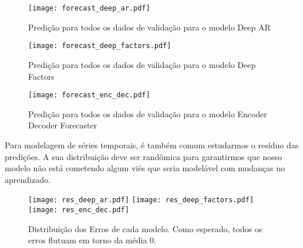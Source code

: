 \begin{figure}[H]
  \label{fig:fordeepar}
  \centering
\texttt{[image: forecast\_deep\_ar.pdf]} 
\caption{Predição para todos os dados de validação para o modelo Deep AR}
\end{figure}

\begin{figure}[H]
  \label{fig:fordeepfactors}
  \centering
\texttt{[image: forecast\_deep\_factors.pdf]} 
\caption{Predição para todos os dados de validação para o modelo Deep Factors}
\end{figure}

\begin{figure}[H]
  \label{fig:forencdec}
  \centering
\texttt{[image: forecast\_enc\_dec.pdf]} 
\caption{Predição para todos os dados de validação para o modelo Encoder Decoder Forecaster} 
\end{figure}


Para modelagem de séries temporais, é também comum estudarmos o resíduo das predições. A sua distribuição deve ser randômica para garantirmos que nosso modelo não está cometendo algum viés que seria
modelável com mudanças no aprendizado. \\


\begin{figure}[H]
\label{fig:distr}
\centering
\texttt{[image: res\_deep\_ar.pdf]} \hfill
\texttt{[image: res\_deep\_factors.pdf]} \hfill
\texttt{[image: res\_enc\_dec.pdf]} 
\caption{Distribuição dos Erros de cada modelo. Como esperado, todos os erros flutuam em torno da média 0. } 
\end{figure}



